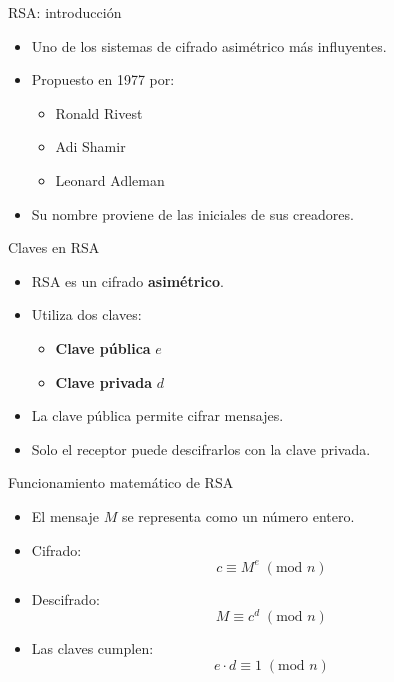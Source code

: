 \documentclass{beamer}
\begin{document}

\begin{frame}{RSA: introducción}
\begin{itemize}
  \item Uno de los sistemas de cifrado asimétrico más influyentes.
  \item Propuesto en 1977 por:
  \begin{itemize}
    \item Ronald Rivest
    \item Adi Shamir
    \item Leonard Adleman
  \end{itemize}
  \item Su nombre proviene de las iniciales de sus creadores.
\end{itemize}
\end{frame}

\begin{frame}{Claves en RSA}
\begin{itemize}
  \item RSA es un cifrado \textbf{asimétrico}.
  \item Utiliza dos claves:
  \begin{itemize}
    \item \textbf{Clave pública} $e$
    \item \textbf{Clave privada} $d$
  \end{itemize}
  \item La clave pública permite cifrar mensajes.
  \item Solo el receptor puede descifrarlos con la clave privada.
\end{itemize}
\end{frame}

\begin{frame}{Funcionamiento matemático de RSA}
\begin{itemize}
  \item El mensaje $M$ se representa como un número entero.
  \item Cifrado:
  \[
    c \equiv M^e \; (\text{mod } n)
  \]
  \item Descifrado:
  \[
    M \equiv c^d \; (\text{mod } n)
  \]
  \item Las claves cumplen:
  \[
    e \cdot d \equiv 1 \; (\text{mod } n)
  \]
\end{itemize}
\end{frame}
\end{document}
